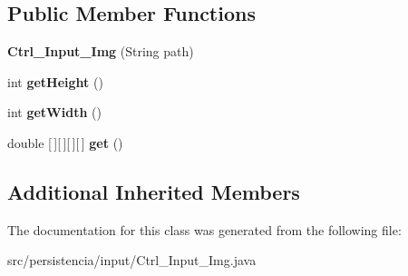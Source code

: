\subsection*{Public Member Functions}
\begin{DoxyCompactItemize}
\item 
\mbox{\label{classpersistencia_1_1input_1_1Ctrl__Input__Img_a79318a62df31dfd107554e92e29f6d9a}} 
{\bfseries Ctrl\+\_\+\+Input\+\_\+\+Img} (String path)
\item 
\mbox{\label{classpersistencia_1_1input_1_1Ctrl__Input__Img_a27e92d786d8f11ce165780984122ac8f}} 
int {\bfseries get\+Height} ()
\item 
\mbox{\label{classpersistencia_1_1input_1_1Ctrl__Input__Img_a4ceade2796ead750824c89f2a1e6dc47}} 
int {\bfseries get\+Width} ()
\item 
\mbox{\label{classpersistencia_1_1input_1_1Ctrl__Input__Img_ac549527b5947a7ec9f40d53e492f4ffa}} 
double \mbox{[}$\,$\mbox{]}\mbox{[}$\,$\mbox{]}\mbox{[}$\,$\mbox{]}\mbox{[}$\,$\mbox{]} {\bfseries get} ()
\end{DoxyCompactItemize}
\subsection*{Additional Inherited Members}


The documentation for this class was generated from the following file\+:\begin{DoxyCompactItemize}
\item 
src/persistencia/input/Ctrl\+\_\+\+Input\+\_\+\+Img.\+java\end{DoxyCompactItemize}
